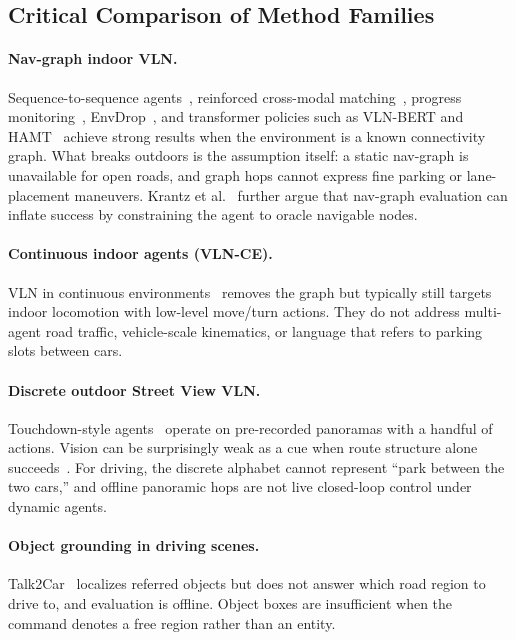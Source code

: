 \subsection{Critical Comparison of Method Families}

\paragraph{Nav-graph indoor VLN.}
Sequence-to-sequence agents~\cite{anderson2018vision}, reinforced cross-modal matching~\cite{Wang_Huang_Celikyilmaz_Gao_Shen_Wang_Wang_Zhang_2019}, progress monitoring~\cite{Ma_Wu_AlRegib_Xiong_Kira_2019,ma2019selfmonitoring}, EnvDrop~\cite{tan2019learning}, and transformer policies such as VLN-BERT and HAMT~\cite{hong2021vln,chen2021hamt} achieve strong results when the environment is a known connectivity graph. What breaks outdoors is the assumption itself: a static nav-graph is unavailable for open roads, and graph hops cannot express fine parking or lane-placement maneuvers. Krantz et al.~\cite{krantz2020beyond} further argue that nav-graph evaluation can inflate success by constraining the agent to oracle navigable nodes.

\paragraph{Continuous indoor agents (VLN-CE).}
VLN in continuous environments~\cite{krantz2020beyond,pashevich2021episodic,chen2022weakly} removes the graph but typically still targets indoor locomotion with low-level move/turn actions. They do not address multi-agent road traffic, vehicle-scale kinematics, or language that refers to parking slots between cars.

\paragraph{Discrete outdoor Street View VLN.}
Touchdown-style agents~\cite{Chen2019TOUCHDOWN,schumann-riezler-2022-analyzing,zhu-etal-2021-multimodal} operate on pre-recorded panoramas with a handful of actions. Vision can be surprisingly weak as a cue when route structure alone succeeds~\cite{hu2019you,schumann-riezler-2022-analyzing}. For driving, the discrete alphabet cannot represent ``park between the two cars,'' and offline panoramic hops are not live closed-loop control under dynamic agents.

\paragraph{Object grounding in driving scenes.}
Talk2Car~\cite{deruyttere2019talk2car} localizes referred objects but does not answer which road region to drive to, and evaluation is offline. Object boxes are insufficient when the command denotes a free region rather than an entity.

